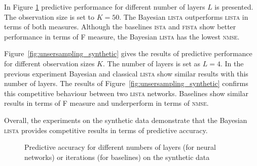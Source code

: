\documentclass[letterpaper]{article}
\begin{document}
In Figure \ref{fig:number_of_layers_synthetic} predictive performance for different number of layers $L$ is presented. The observation size is set to $K=50$. The Bayesian \textsc{lista} outperforms \textsc{lista} in terms of both measures. Although the baselines \textsc{ista} and \textsc{fista} show better performance in terms of F measure, the Bayesian \textsc{lista} has the lowest \textsc{nmse}.

Figure~\ref{fig:unsersampling_synthetic} gives the results of predictive performance for different observation sizes $K$. The number of layers is set as $L=4$. In the previous experiment Bayesian and classical \textsc{lista} show similar results with this number of layers. The results of Figure~\ref{fig:unsersampling_synthetic} confirms this competitive behaviour between two \textsc{lista} networks. Baselines show similar results in terms of F measure and underperform in terms of \textsc{nmse}.

Overall, the experiments on the synthetic data demonstrate that the Bayesian \textsc{lista} provides competitive results in terms of predictive accuracy.

\begin{figure}[t]
\centering
\caption{Predictive accuracy for different numbers of layers (for neural networks) or iterations (for baselines) on the synthetic data}
\label{fig:number_of_layers_synthetic}
\end{figure}
\end{document}
